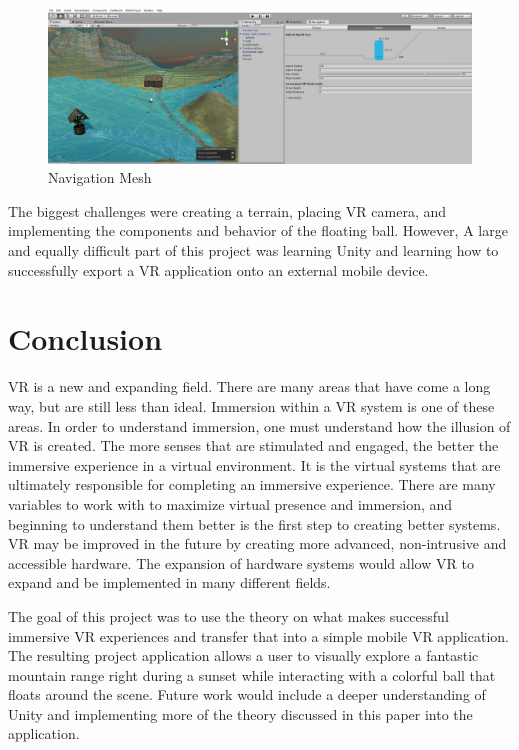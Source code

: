 \documentclass[12pt]{article}
\begin{document}
 \begin{figure}[h]
    \centering
 \includegraphics[width=.9\textwidth]{Software9}
  \caption{Navigation Mesh}
  \label{fig:navMesh}
 \end{figure}


The biggest challenges were creating a terrain, placing VR camera, and implementing the components and behavior of the floating ball. However, A large and equally difficult part of this project was learning Unity and learning how to successfully export a VR application onto an external mobile device.



 \clearpage
 
 
\section{Conclusion}

VR is a new and expanding field. There are many areas that have come a long way, but are still less than ideal. Immersion within a VR system is one of these areas. In order to understand immersion, one must understand how the illusion of VR is created. The more senses that are stimulated and engaged, the better the immersive experience in a virtual environment. It is the virtual systems that are ultimately responsible for completing an immersive experience. There are many variables to work with to maximize virtual presence and immersion, and beginning to understand them better is the first step to creating better systems. VR may be improved in the future by creating more advanced, non-intrusive and accessible hardware. The expansion of hardware systems would allow VR to expand and be implemented in many different fields. 

\par The goal of this project was to use the theory on what makes successful immersive VR experiences and transfer that into a simple mobile VR application. The resulting project application allows a user to visually explore a fantastic mountain range right during a sunset while interacting with a colorful ball that floats around the scene. Future work would include a deeper understanding of Unity and implementing more of the theory discussed in this paper into the application.
\end{document}
